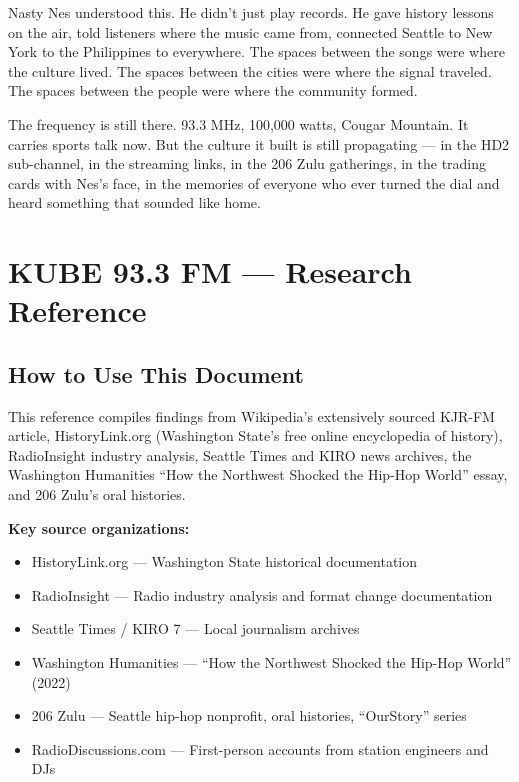 \documentclass[11pt,letterpaper]{article}
\newcommand{\stageheader}[2]{%
  \noindent\colorbox{#2}{\makebox[\textwidth][l]{%
    \textcolor{white}{\bfseries\sffamily\hspace{6pt}#1\hspace{6pt}}}}%
  \vspace{0.5em}\par%
}
\begin{document}
Nasty Nes understood this. He didn't just play records. He gave history lessons on the air, told listeners where the music came from, connected Seattle to New York to the Philippines to everywhere. The spaces between the songs were where the culture lived. The spaces between the cities were where the signal traveled. The spaces between the people were where the community formed.

The frequency is still there. 93.3 MHz, 100,000 watts, Cougar Mountain. It carries sports talk now. But the culture it built is still propagating --- in the HD2 sub-channel, in the streaming links, in the 206 Zulu gatherings, in the trading cards with Nes's face, in the memories of everyone who ever turned the dial and heard something that sounded like home.

\newpage

\stageheader{STAGE 2 --- RESEARCH REFERENCE}{secondary}

\section{KUBE 93.3 FM --- Research Reference}

\subsection{How to Use This Document}

This reference compiles findings from Wikipedia's extensively sourced KJR-FM article, HistoryLink.org (Washington State's free online encyclopedia of history), RadioInsight industry analysis, Seattle Times and KIRO news archives, the Washington Humanities ``How the Northwest Shocked the Hip-Hop World'' essay, and 206 Zulu's oral histories.

\textbf{Key source organizations:}
\begin{itemize}[leftmargin=2em]
\item HistoryLink.org --- Washington State historical documentation
\item RadioInsight --- Radio industry analysis and format change documentation
\item Seattle Times / KIRO 7 --- Local journalism archives
\item Washington Humanities --- ``How the Northwest Shocked the Hip-Hop World'' (2022)
\item 206 Zulu --- Seattle hip-hop nonprofit, oral histories, ``OurStory'' series
\item RadioDiscussions.com --- First-person accounts from station engineers and DJs
\end{itemize}
\end{document}
